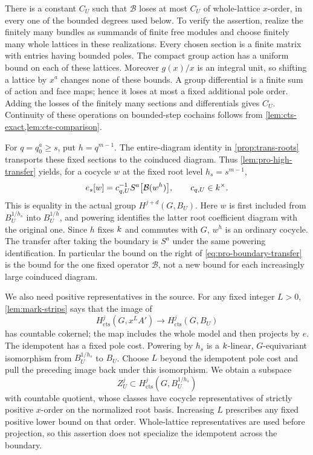 There is a constant $C_U$ such that $\mathcal B$ loses at most
$C_U$ of whole-lattice $x$-order, in every one of the bounded
degrees used below.  To verify the assertion, realize the finitely
many bundles as summands of finite free modules and choose
finitely many whole lattices in these realizations.  Every chosen
section is a finite matrix with entries having bounded poles.
The compact group action has a uniform bound on each of these
lattices.  Moreover $g(x)/x$ is an integral unit, so shifting a
lattice by $x^a$ changes none of these bounds.  A group
differential is a finite sum of action and face maps; hence
it loses at most a fixed additional pole order.  Adding the
losses of the finitely many sections and differentials gives
$C_U$.  Continuity of these operations on bounded-step
cochains follows from \cref{lem:cts-exact,lem:cts-comparison}.

For $q=q_0^a\geq s$, put $h=q^{m-1}$.
The entire-diagram identity in \cref{prop:trans-roots} transports
these fixed sections to the coinduced diagram.  Thus
\cref{lem:pro-high-transfer} yields, for a cocycle $w$ at the
fixed root level $h_s=s^{m-1}$,
\begin{equation}
\label{eq:pro-boundary-transfer}
 e_s[w]
   = c_{q,U}^{-1}
       S^a\bigl[\mathcal B(w^h)\bigr],
       \qquad c_{q,U}\in k^\times.
\end{equation}
This is equality in the actual group $H^{j+d}(G,B_U)$.
Here $w$ is first included from $B_U^{1/h_s}$ into
$B_U^{1/h}$, and powering identifies the latter root
coefficient diagram with the original one.  Since $h$ fixes
$k$ and commutes with $G$, $w^h$ is an ordinary cocycle.
The transfer after taking the boundary is $S^a$ under the
same powering identification.  In particular the bound on
the right of \cref{eq:pro-boundary-transfer} is the bound
for the one fixed operator $\mathcal B$, not a new bound
for each increasingly large coinduced diagram.

We also need positive representatives in the source.  For any
fixed integer $L>0$, \cref{lem:mark-strips} says that the image
of
\[
 H^j_{\mathrm{cts}}(G,x^LA')\longrightarrow
 H^j_{\mathrm{cts}}(G,B_U)
\]
has countable cokernel; the map includes the whole model and
then projects by $e$.  The idempotent has a fixed pole cost.
Powering by $h_s$ is a $k$-linear, $G$-equivariant
isomorphism from $B_U^{1/h_s}$ to $B_U$.  Choose $L$ beyond
the idempotent pole cost and pull the preceding image back
under this isomorphism.  We obtain a subspace
\begin{equation}
\label{eq:pro-positive-source}
 Z_U^j\subset H^j_{\mathrm{cts}}(G,B_U^{1/h_s})
\end{equation}
with countable quotient, whose classes have cocycle
representatives of strictly positive $x$-order on the
normalized root basis.  Increasing $L$ prescribes any fixed
positive lower bound on that order.  Whole-lattice
representatives are used before projection, so this assertion
does not specialize the idempotent across the boundary.

